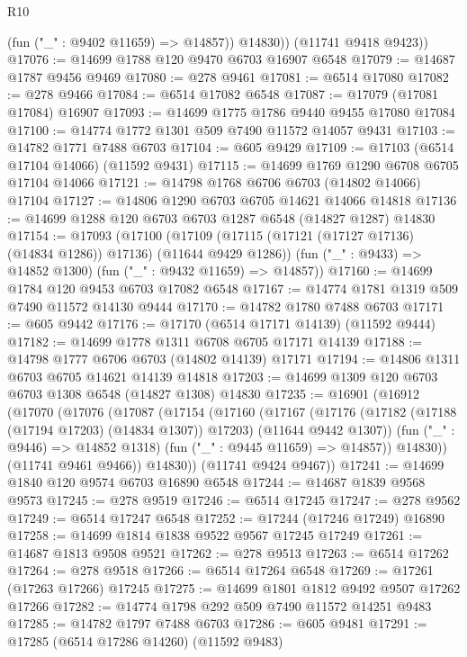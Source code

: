 \begin{lexlean}{R10}
\begin{coremodule}
            (fun ("_" : @9402 @11659) => @14857))
          @14830))
      (@11741 @9418 @9423))
@17076 := @14699 @1788 @120 @9470 @6703 @16907 @6548
@17079 := @14687 @1787 @9456 @9469
@17080 := @278 @9461
@17081 := @6514 @17080
@17082 := @278 @9466
@17084 := @6514 @17082 @6548
@17087 := @17079 (@17081 @17084) @16907
@17093 := @14699 @1775 @1786 @9440 @9455 @17080 @17084
@17100 := @14774 @1772 @1301 @509 @7490 @11572 @14057 @9431
@17103 := @14782 @1771 @7488 @6703
@17104 := @605 @9429
@17109 := @17103 (@6514 @17104 @14066) (@11592 @9431)
@17115 := @14699 @1769 @1290 @6708 @6705 @17104 @14066
@17121 := @14798 @1768 @6706 @6703 (@14802 @14066) @17104
@17127 := @14806 @1290 @6703 @6705 @14621 @14066 @14818
@17136 := @14699 @1288 @120 @6703 @6703 @1287 @6548 (@14827 @1287) @14830
@17154 := @17093
    (@17100
      (@17109 (@17115 (@17121 (@17127 @17136) (@14834 @1286)) @17136) (@11644 @9429 @1286))
      (fun ("_" : @9433) => @14852 @1300)
      (fun ("_" : @9432 @11659) => @14857))
@17160 := @14699 @1784 @120 @9453 @6703 @17082 @6548
@17167 := @14774 @1781 @1319 @509 @7490 @11572 @14130 @9444
@17170 := @14782 @1780 @7488 @6703
@17171 := @605 @9442
@17176 := @17170 (@6514 @17171 @14139) (@11592 @9444)
@17182 := @14699 @1778 @1311 @6708 @6705 @17171 @14139
@17188 := @14798 @1777 @6706 @6703 (@14802 @14139) @17171
@17194 := @14806 @1311 @6703 @6705 @14621 @14139 @14818
@17203 := @14699 @1309 @120 @6703 @6703 @1308 @6548 (@14827 @1308) @14830
@17235 := @16901
    (@16912
      (@17070
        (@17076
          (@17087
            (@17154
              (@17160
                (@17167
                  (@17176
                    (@17182 (@17188 (@17194 @17203) (@14834 @1307)) @17203)
                    (@11644 @9442 @1307))
                  (fun ("_" : @9446) => @14852 @1318)
                  (fun ("_" : @9445 @11659) => @14857))
                @14830))
            (@11741 @9461 @9466))
          @14830))
      (@11741 @9424 @9467))
@17241 := @14699 @1840 @120 @9574 @6703 @16890 @6548
@17244 := @14687 @1839 @9568 @9573
@17245 := @278 @9519
@17246 := @6514 @17245
@17247 := @278 @9562
@17249 := @6514 @17247 @6548
@17252 := @17244 (@17246 @17249) @16890
@17258 := @14699 @1814 @1838 @9522 @9567 @17245 @17249
@17261 := @14687 @1813 @9508 @9521
@17262 := @278 @9513
@17263 := @6514 @17262
@17264 := @278 @9518
@17266 := @6514 @17264 @6548
@17269 := @17261 (@17263 @17266) @17245
@17275 := @14699 @1801 @1812 @9492 @9507 @17262 @17266
@17282 := @14774 @1798 @292 @509 @7490 @11572 @14251 @9483
@17285 := @14782 @1797 @7488 @6703
@17286 := @605 @9481
@17291 := @17285 (@6514 @17286 @14260) (@11592 @9483)

\end{coremodule}
\end{lexlean}
